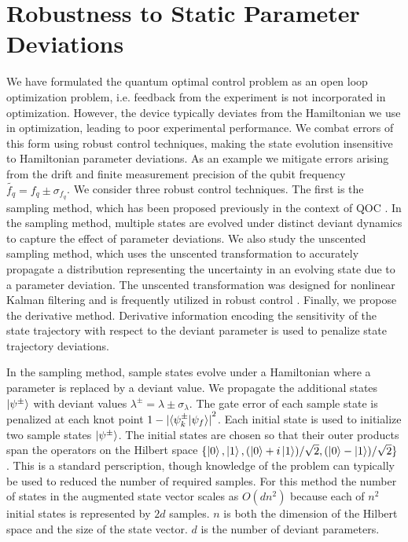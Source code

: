 \section{Robustness to Static Parameter Deviations \label{sec:static}}
We have formulated the quantum optimal control
problem as an open loop optimization problem, i.e.
feedback from the experiment is not incorporated in optimization.
However, the device typically deviates from the Hamiltonian we use in optimization,
leading to poor experimental performance. We combat errors
of this form using robust control techniques,
making the state evolution insensitive
to Hamiltonian parameter deviations. As an example
we mitigate errors arising from the drift and finite measurement
precision of the qubit frequency $\tilde{f_{q}} = f_{q} \pm \sigma_{f_{q}}$.
We consider three robust control techniques.
The first is the sampling method, which has
been proposed previously in the context of QOC
\cite{rembold2020introduction, reinhold2019controlling, carvalho2020error}. In the
sampling method, multiple states are evolved under distinct deviant dynamics
to capture the effect of parameter deviations. We also
study the unscented sampling method, which uses the unscented
transformation to accurately propagate a distribution
representing the uncertainty in an evolving state
due to a parameter deviation.
The unscented transformation was designed for nonlinear Kalman
filtering and is frequently utilized in robust control
\cite{julier2004unscented, lee2013sigma, manchester2016derivative}.
Finally, we propose the derivative method. Derivative
information encoding the sensitivity of the
state trajectory with respect to the deviant parameter
is used to penalize state trajectory deviations.

In the sampling method, sample states evolve under a
Hamiltonian where a parameter is replaced by
a deviant value. We propagate the additional states $\ket{\psi^{\pm}}$ with
deviant values $\lambda^{\pm} = \lambda \pm \sigma_{\lambda}$.
The gate error of each sample state is 
penalized at each knot point
$1 - {\lvert \braket{\psi^{\pm}_{k} | \psi_{f}} \rvert}^{2}$.
Each initial state is used to initialize two
sample states $\ket{\psi^{\pm}}$.
The initial states are chosen so
that their outer products span the operators on the
Hilbert space $\{\ket{0}, \ket{1}, (\ket{0} + i\ket{1}) / \sqrt{2},
(\ket{0} - \ket{1}) / \sqrt{2}\}$ \cite{chow2009randomized}.
This is a standard perscription, though knowledge
of the problem can typically be used to reduced the number
of required samples. For this method the number of states in the augmented state vector
scales as $O(dn^{2})$ because each of $n^{2}$ initial
states is represented by $2d$ samples. $n$ is both the dimension of the Hilbert space
and the size of the state vector. $d$ is the number of deviant parameters.

